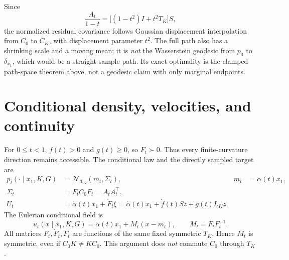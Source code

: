 \documentclass[11pt,letterpaper]{article}
\newcommand{\X}{\mathcal X_G}
\newcommand{\cN}{\mathcal N}
\begin{document}
Since
\begin{equation}
\frac{A_t}{1-t}=\bigl[(1-t^2)I+t^2T_K\bigr]S,
\label{eq:residual-bures}
\end{equation}
the normalized residual covariance follows Gaussian displacement interpolation from $C_0$ to $C_K$, with displacement parameter $t^2$. The full path also has a shrinking scale and a moving mean; it is \emph{not} the Wasserstein geodesic from $p_0$ to $\delta_{x_1}$, which would be a straight sample path. Its exact optimality is the clamped path-space theorem above, not a geodesic claim with only marginal endpoints.

\section{Conditional density, velocities, and continuity}
\label{sec:conditional}

For $0\leq t<1$, $f(t)>0$ and $g(t)\geq0$, so $F_t\succ0$. Thus every finite-curvature direction remains accessible. The conditional law and the directly sampled target are
\begin{equation}
\boxed{\begin{aligned}
p_t(\cdot\mid x_1,K,G)&=\cN_{\X}(m_t,\Sigma_t),&m_t&=\alpha(t)x_1,\\
\Sigma_t&=F_tC_0F_t=A_tA_t^\top,\\
U_t&=\dot\alpha(t)x_1+\dot F_t\xi
=\dot\alpha(t)x_1+\dot f(t)Sz+\dot g(t)L_Kz.
\end{aligned}}
\label{eq:law-target}
\end{equation}
The Eulerian conditional field is
\begin{equation}
\boxed{u_t(x\mid x_1,K,G)=\dot\alpha(t)x_1+M_t(x-m_t),\qquad
M_t=\dot F_tF_t^{-1}.}
\label{eq:conditional-velocity}
\end{equation}
All matrices $F_t,\dot F_t,\ddot F_t$ are functions of the same fixed symmetric $T_K$. Hence $M_t$ is symmetric, even if $C_0K\ne KC_0$. This argument does \emph{not} commute $C_0$ through $T_K$.
\end{document}
